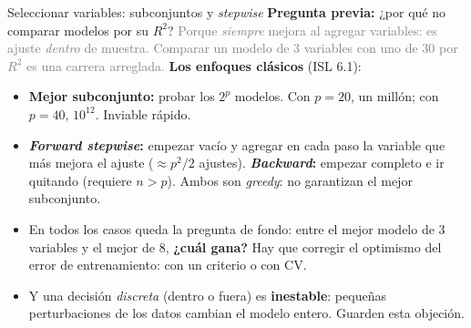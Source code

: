\documentclass{beamer}
\newcommand{\1}{\mathbb{I}}
\begin{document}
\begin{frame}{Seleccionar variables: subconjuntos y \emph{stepwise}}
\small
\textbf{Pregunta previa:} ¿por qué no comparar modelos por su $R^2$?
\pause
\textcolor{gray}{Porque \emph{siempre} mejora al agregar variables: es ajuste \emph{dentro} de muestra. Comparar un modelo de 3 variables con uno de 30 por $R^2$ es una carrera arreglada.}
\pause
\vspace{0.1cm}
\textbf{Los enfoques clásicos} (ISL 6.1):
\begin{itemize}\itemsep3pt
  \item \textbf{Mejor subconjunto:} probar los $2^p$ modelos. Con $p = 20$, un millón; con $p = 40$, $10^{12}$. Inviable rápido.
  \item \textbf{\emph{Forward stepwise}:} empezar vacío y agregar en cada paso la variable que más mejora el ajuste ($\approx p^2/2$ ajustes). \textbf{\emph{Backward}:} empezar completo e ir quitando (requiere $n > p$). Ambos son \emph{greedy}: no garantizan el mejor subconjunto. \pause
\end{itemize}
\vspace{0.1cm}
\begin{itemize}\itemsep3pt
  \item En todos los casos queda la pregunta de fondo: entre el mejor modelo de 3 variables y el mejor de 8, \textbf{¿cuál gana?} Hay que corregir el optimismo del error de entrenamiento: con un criterio o con CV.
  \item Y una decisión \emph{discreta} (dentro o fuera) es \textbf{inestable}: pequeñas perturbaciones de los datos cambian el modelo entero. Guarden esta objeción.
\end{itemize}
\end{frame}
\end{document}

